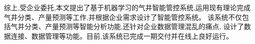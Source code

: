 综上,受企业委托,本文提出了基于机器学习的气井智能管控系统,运用现有理论完成气井分类、产量预测等工作,并根据企业需求设计了智能管控系统。
该系统不仅包括气井分类、产量预测等智能分析功能,还针对企业数据管理混乱的痛点,
设计了数据连接、数据管理等功能。目前,该系统已完成一期交付并在线上良好运行。





